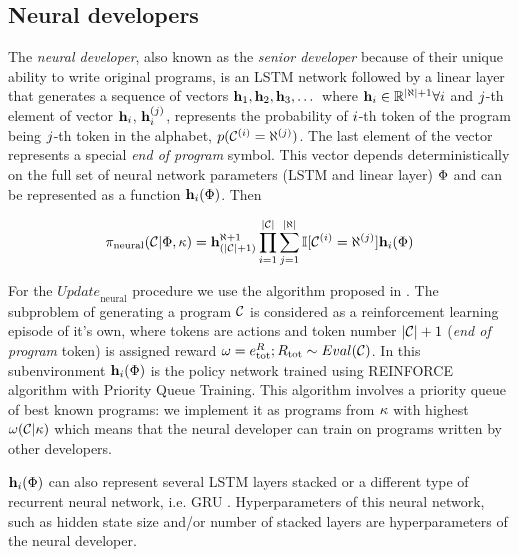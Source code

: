 \newpage \subsection{Neural developers}
\label{sec:neural}

The \emph{neural developer}, also known as the \emph{senior developer} because of their unique ability to write original programs, is an LSTM \cite{hochreiterLongShorttermMemory1997} network followed by a linear layer that generates a sequence of vectors $\mathbf{h}_{1},\mathbf{h}_{2},\mathbf{h}_{3},\dots$ where $\mathbf{h}_i \in \mathbb{R}^{|\aleph| + 1} \forall i$ and $j$-th element of vector $\mathbf{h}_i$, $\mathbf{h}_i^{(j)}$, represents the probability of $i$-th token of the program being $j$-th token in the alphabet, $p(\mathcal{C}^{(i)}=\aleph^{(j)})$.
The last element of the vector represents a special \emph{end of program} symbol.
This vector depends deterministically on the full set of neural network parameters (LSTM and linear layer) $\Phi$ and can be represented as a function $\mathbf{h}_i(\Phi)$.
Then

\begin{equation}
    \pi_\text{neural}(\mathcal{C} | \Phi, \kappa) = \mathbf{h}_{(|\mathcal{C}|+1)}^{\aleph+1}
    \prod\limits_{i=1}^{|\mathcal{C}|}
    \sum\limits_{j=1}^{|\aleph|} \mathbb{I} [\mathcal{C}^{(i)}=\aleph^{(j)}]
    \mathbf{h}_i(\Phi)
\end{equation}

For the $\mathit{Update}_\text{neural}$ procedure we use the algorithm proposed in \cite{abolafiaNeuralProgramSynthesis2018}.
The subproblem of generating a program $\mathcal{C}$ is considered as a reinforcement learning episode of it's own, where tokens are actions and token number $|\mathcal{C}|+1$ (\emph{end of program} token) is assigned reward $\omega = e^R_\text{tot}; R_\text{tot} \sim Eval(\mathcal{C})$. 
In this subenvironment $\mathbf{h}_i(\Phi)$ is the policy network \cite[chapter 13]{suttonReinforcementLearningSecond2018} trained using REINFORCE algorithm with Priority Queue Training.
This algorithm involves a priority queue of best known programs: we implement it as programs from $\kappa$ with highest $\omega(\mathcal{C}|\kappa)$ which means that the neural developer can train on programs written by other developers.

$\mathbf{h}_i(\Phi)$ can also represent several LSTM layers stacked or a different type of recurrent neural network, i.e. GRU \cite{choPropertiesNeuralMachine2014,chung2014empirical}.
Hyperparameters of this neural network, such as hidden state size and/or number of stacked layers are hyperparameters of the neural developer.  

